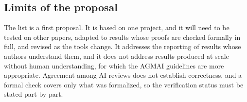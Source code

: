 \subsection{Limits of the proposal}

The list is a first proposal. It is based on one project, and it will need to be tested on other papers, adapted
to results whose proofs are checked formally in full, and revised as the tools change. It addresses the reporting of results whose authors understand them, and it
does not address results produced at scale without human understanding, for which the AGMAI guidelines are more
appropriate. Agreement among AI reviews does not establish correctness, and a formal check covers only what was
formalized, so the verification status must be stated part by part.
